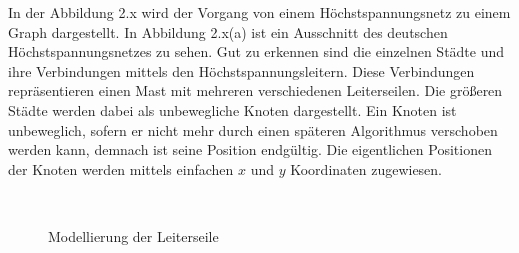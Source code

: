 In der Abbildung 2.x wird der Vorgang von einem Höchstspannungsnetz zu einem Graph dargestellt. In Abbildung 2.x(a) ist ein Ausschnitt des deutschen Höchstspannungsnetzes zu sehen. Gut zu erkennen sind die einzelnen Städte und ihre Verbindungen mittels den Höchstspannungsleitern. Diese Verbindungen repräsentieren einen Mast mit mehreren verschiedenen Leiterseilen. Die größeren Städte werden dabei als unbewegliche Knoten dargestellt. Ein Knoten ist unbeweglich, sofern er nicht mehr durch einen späteren Algorithmus verschoben werden kann, demnach ist seine Position endgültig. Die eigentlichen Positionen der Knoten werden mittels einfachen $x$ und $y$ Koordinaten zugewiesen. \\ 

\begin{figure}[t]
	\centering
	\hspace{1.0cm}%
	\\
	\caption[Modellierung der Leiterseile]{Modellierung der Leiterseile}
	\label{fig_testbild2}
\end{figure}


